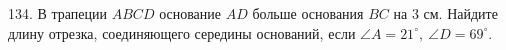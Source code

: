 134. В трапеции $ABCD$ основание $AD$ больше основания $BC$ на 3 см. Найдите длину отрезка, соединяющего середины оснований, если $\angle A=21^\circ,\ \angle D=69^\circ.$\\
